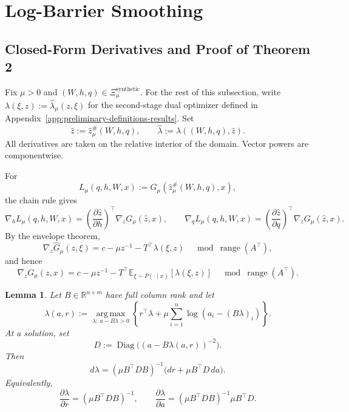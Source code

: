 \documentclass{article}
\newcommand{\E}{\mathbb{E}}
\newcommand{\1}{\mathbf{1}}
\newcommand{\argmax}{\operatorname*{arg\,max}}
\theoremstyle{plain}
\newtheorem{lemma}{Lemma}
\theoremstyle{definition}
\theoremstyle{remark}
\begin{document}
\section{Log-Barrier Smoothing}
\label{app:log-barrier-smoothing}


\subsection{Closed-Form Derivatives and Proof of Theorem 2}
\label{app:closed-form-derivatives}
\label{app:no-vanishing-gradients-proof}

Fix $\mu>0$ and $(W,h,q)\in\Xi_\mu^{\mathrm{synthetic}}$. For the rest of this subsection, write $\lambda(\xi,z):=\hat\lambda_\mu(z,\xi)$ for the second-stage dual optimizer defined in Appendix~\ref{app:preliminary-definitions-results}. Set
\[
        \hat z:=\hat z_\mu^\#(W,h,q),
        \qquad
        \hat\lambda:=\lambda((W,h,q),\hat z).
\]
All derivatives are taken on the relative interior of the domain. Vector powers are componentwise.

For
\[
        L_\mu(q,h,W,x):=G_\mu(\hat z_\mu^\#(W,h,q),x),
\]
the chain rule gives
\[
        \nabla_h L_\mu(q,h,W,x)
        =
        \left(\frac{\partial \hat z}{\partial h}\right)^\top
        \nabla_zG_\mu(\hat z,x),
        \qquad
        \nabla_q L_\mu(q,h,W,x)
        =
        \left(\frac{\partial \hat z}{\partial q}\right)^\top
        \nabla_zG_\mu(\hat z,x).
\]
By the envelope theorem,
\[
        \nabla_z \widehat G_\mu(z,\xi)
        =
        c-\mu z^{-1}-T^\top\lambda(\xi,z)
        \quad \bmod\operatorname{range}(A^\top),
\]
and hence
\[
        \nabla_z G_\mu(z,x)
        =
        c-\mu z^{-1}
        -
        T^\top \E_{\xi\sim P(\cdot\mid x)}[\lambda(\xi,z)]
        \quad \bmod\operatorname{range}(A^\top).
\]

\begin{lemma}
Let $B\in\mathbb R^{n\times m}$ have full column rank and let
\[
        \lambda(a,r)
        :=
        \argmax_{\lambda:\ a-B\lambda>0}
        \left\{
        r^\top\lambda
        +
        \mu\sum_{i=1}^n \log(a_i-(B\lambda)_i)
        \right\}.
\]
At a solution, set
\[
        D:=\operatorname{Diag}\bigl((a-B\lambda(a,r))^{-2}\bigr).
\]
Then
\[
        d\lambda
        =
        (\mu B^\top D B)^{-1}
        \bigl(dr+\mu B^\top D\,da\bigr).
\]
Equivalently,
\[
        \frac{\partial\lambda}{\partial r}
        =
        (\mu B^\top D B)^{-1},
        \qquad
        \frac{\partial\lambda}{\partial a}
        =
        (\mu B^\top D B)^{-1}\mu B^\top D .
\]
\end{lemma}
\end{document}
